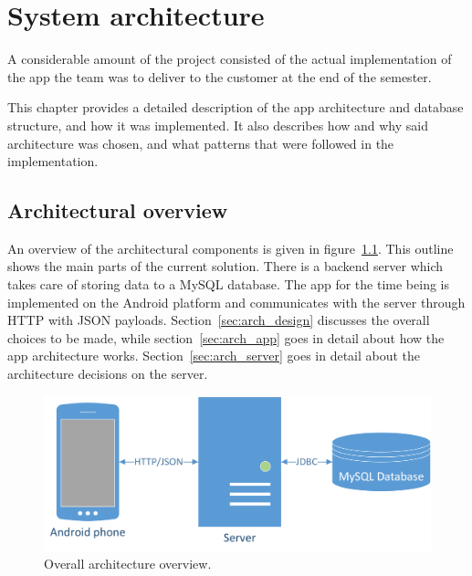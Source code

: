 \chapter{System architecture}

A considerable amount of the project consisted of the actual implementation of the app the team was to deliver to the customer at the end of the semester. 

This chapter provides a detailed description of the app architecture and database structure, and how it was implemented. It also describes how and why said architecture was chosen, and what patterns that were followed in the implementation. 

\section{Architectural overview}
An overview of the architectural components is given in figure~\ref{fig:architecture}. This outline shows the main parts of the current solution. There is a backend server which takes care of storing data to a MySQL database. The app for the time being is implemented on the Android platform and communicates with the server through HTTP with JSON payloads. Section~\ref{sec:arch_design} discusses the overall choices to be made, while section~\ref{sec:arch_app} goes in detail about how the app architecture works. Section~\ref{sec:arch_server} goes in detail about the architecture decisions on the server.

\begin{figure}[H]
\includegraphics[width=\textwidth]{ch/architecture/fig/arch.png}
\caption{Overall architecture overview.}
\label{fig:architecture}
\end{figure}





